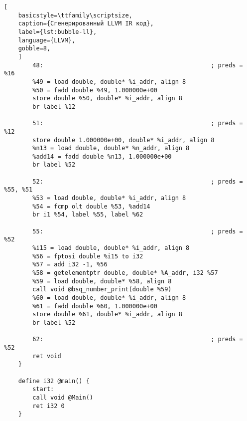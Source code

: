 \begin{lstlisting}[
	basicstyle=\ttfamily\scriptsize,
	caption={Сгенерированный LLVM IR код},
	label={lst:bubble-ll},
	language={LLVM},
	gobble=8,
	]
		48:                                               ; preds = %16
		%49 = load double, double* %i_addr, align 8
		%50 = fadd double %49, 1.000000e+00
		store double %50, double* %i_addr, align 8
		br label %12

		51:                                               ; preds = %12
		store double 1.000000e+00, double* %i_addr, align 8
		%n13 = load double, double* %n_addr, align 8
		%add14 = fadd double %n13, 1.000000e+00
		br label %52

		52:                                               ; preds = %55, %51
		%53 = load double, double* %i_addr, align 8
		%54 = fcmp olt double %53, %add14
		br i1 %54, label %55, label %62

		55:                                               ; preds = %52
		%i15 = load double, double* %i_addr, align 8
		%56 = fptosi double %i15 to i32
		%57 = add i32 -1, %56
		%58 = getelementptr double, double* %A_addr, i32 %57
		%59 = load double, double* %58, align 8
		call void @bsq_number_print(double %59)
		%60 = load double, double* %i_addr, align 8
		%61 = fadd double %60, 1.000000e+00
		store double %61, double* %i_addr, align 8
		br label %52
		
		62:                                               ; preds = %52
		ret void
	}

	define i32 @main() {
		start:
		call void @Main()
		ret i32 0
	}
\end{lstlisting}
